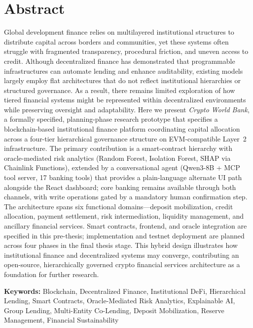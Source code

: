 \documentclass[12pt,a4paper]{report}
\begin{document}
\chapter*{Abstract}
{}

Global development finance relies on multilayered institutional structures to distribute capital across borders and communities, yet these systems often struggle with fragmented transparency, procedural friction, and uneven access to credit. Although decentralized finance has demonstrated that programmable infrastructures can automate lending and enhance auditability, existing models largely employ flat architectures that do not reflect institutional hierarchies or structured governance. As a result, there remains limited exploration of how tiered financial systems might be represented within decentralized environments while preserving oversight and adaptability. Here we present \textit{Crypto World Bank}, a formally specified, planning-phase research prototype that specifies a blockchain-based institutional finance platform coordinating capital allocation across a four-tier hierarchical governance structure on EVM-compatible Layer~2 infrastructure. The primary contribution is a smart-contract hierarchy with oracle-mediated risk analytics (Random Forest, Isolation Forest, SHAP via Chainlink Functions), extended by a conversational agent (Qwen3-8B + MCP tool server, 17 banking tools) that provides a plain-language alternate UI path alongside the React dashboard; core banking remains available through both channels, with write operations gated by a mandatory human confirmation step. The architecture spans six functional domains---deposit mobilization, credit allocation, payment settlement, risk intermediation, liquidity management, and ancillary financial services. Smart contracts, frontend, and oracle integration are specified in this pre-thesis; implementation and testnet deployment are planned across four phases in the final thesis stage. This hybrid design illustrates how institutional finance and decentralized systems may converge, contributing an open-source, hierarchically governed crypto financial services architecture as a foundation for further research.

\vspace{0.5em}
\noindent\textbf{Keywords:} Blockchain, Decentralized Finance, Institutional DeFi, Hierarchical Lending, Smart Contracts, Oracle-Mediated Risk Analytics, Explainable AI, Group Lending, Multi-Entity Co-Lending, Deposit Mobilization, Reserve Management, Financial Sustainability
\end{document}
